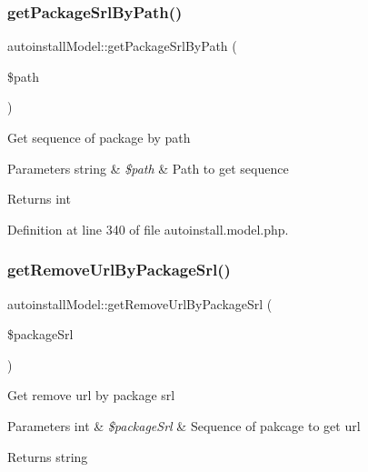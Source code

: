 \hypertarget{classautoinstallModel_a7344733b35feec3a7bcc8a1440d2e682}{}\label{classautoinstallModel_a7344733b35feec3a7bcc8a1440d2e682} 
\subsubsection{\texorpdfstring{get\+Package\+Srl\+By\+Path()}{getPackageSrlByPath()}}
{\footnotesize\ttfamily autoinstall\+Model\+::get\+Package\+Srl\+By\+Path (\begin{DoxyParamCaption}\item[{}]{\$path }\end{DoxyParamCaption})}

Get sequence of package by path


\begin{DoxyParams}[1]{Parameters}
string & {\em \$path} & Path to get sequence \\
\hline
\end{DoxyParams}
\begin{DoxyReturn}{Returns}
int 
\end{DoxyReturn}


Definition at line 340 of file autoinstall.\+model.\+php.

\hypertarget{classautoinstallModel_aa2b3fa8f08e15bfb1a9a061aca6dfa8c}{}\label{classautoinstallModel_aa2b3fa8f08e15bfb1a9a061aca6dfa8c} 
\subsubsection{\texorpdfstring{get\+Remove\+Url\+By\+Package\+Srl()}{getRemoveUrlByPackageSrl()}}
{\footnotesize\ttfamily autoinstall\+Model\+::get\+Remove\+Url\+By\+Package\+Srl (\begin{DoxyParamCaption}\item[{}]{\$package\+Srl }\end{DoxyParamCaption})}

Get remove url by package srl


\begin{DoxyParams}[1]{Parameters}
int & {\em \$package\+Srl} & Sequence of pakcage to get url \\
\hline
\end{DoxyParams}
\begin{DoxyReturn}{Returns}
string 
\end{DoxyReturn}


